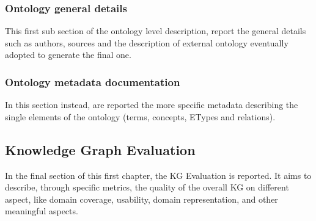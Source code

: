 \subsubsection{Ontology general details}
This first sub section of the ontology level description, report the general details such as authors, sources and the description of external ontology eventually adopted to generate the final one.

\subsubsection{Ontology metadata documentation}
In this section instead, are reported the more specific metadata describing the single elements of the ontology (terms, concepts, ETypes and relations).

\subsection{Knowledge Graph Evaluation}
In the final section of this first chapter, the KG Evaluation is reported. It aims to describe, through specific metrics, the quality of the overall KG on different aspect, like domain coverage, usability, domain representation, and other meaningful aspects.